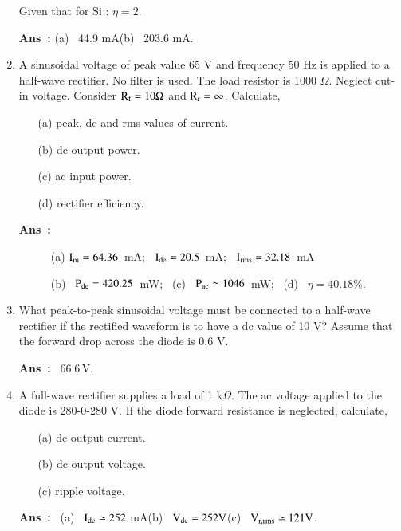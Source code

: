 \begin{enumerate}
Given that for Si : $\eta=2$.

\smallskip
\noindent
{\bf Ans~:} (a)~ 44.9 mA\qquad (b)~ 203.6 mA.

\item A sinusoidal voltage of peak value 65 V and frequency 50 Hz is applied to a half-wave rectifier. No filter is used. The load resistor is 1000 $\Omega$. Neglect cut-in voltage. Consider $\textrm{R}_{\textrm{f}}=10\Omega$ and $\textrm{R}_{\textrm{r}}=\infty$. Calculate,
\begin{itemize}
\item[(a)] peak, dc and rms values of current.

\item[(b)] dc output power.

\item[(c)] ac input power.

\item[(d)] rectifier efficiency.
\end{itemize}
\begin{description}
\item[{\bf Ans~:}] (a) $\textrm{I}_{\textrm{m}}=64.36$~mA; \ $\textrm{I}_{\text{de}}=20.5$~mA; \ $\textrm{I}_{\text{rms}}=32.18$~mA

(b)~ $\textrm{P}_{\text{de}}=420.25$~mW; \ (c)~ $\textrm{P}_{\text{ac}}\simeq 1046$~mW; \ (d)~ $\eta=40.18\%$.
\end{description}

\item What peak-to-peak sinusoidal voltage must be connected to a half-wave rectifier if the rectified waveform is to have a dc value of 10 V? Assume that the forward drop across the diode is 0.6 V.

\smallskip
\noindent
{\bf Ans~:}~ 66.6\,V.

\item A full-wave rectifier supplies a load of 1 k$\Omega$. The ac voltage applied to the diode is 280-0-280 V. If the diode forward resistance is neglected, calculate, 
\begin{itemize}
\item[(a)] dc output current.

\item[(b)] dc output voltage.

\item[(c)] ripple voltage.
\end{itemize}

\smallskip
\noindent
{\bf Ans~:}~ (a)~ $\textrm{I}_{\text{dc}}\simeq 252$ mA\qquad (b)~ $\textrm{V}_{\text{dc}}=252\textrm{V}$\qquad (c)~ $\textrm{V}_{\text{r,rms}}\simeq 121\textrm{V}$.


\end{enumerate}
